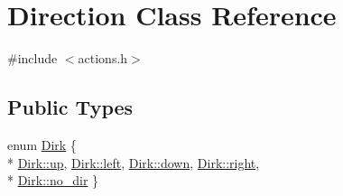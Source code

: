 \hypertarget{class_direction}{\section{Direction Class Reference}
\label{class_direction}
}


{\ttfamily \#include $<$actions.\-h$>$}

\subsection*{Public Types}
\begin{DoxyCompactItemize}
\item 
enum \hyperlink{class_direction_a218282b2789da5abcafb2be32cf99011}{Dirk} \{ \\*
\hyperlink{class_direction_a218282b2789da5abcafb2be32cf99011a46c48bec0d282018b9d167eef7711b2c}{Dirk\-::up}, 
\hyperlink{class_direction_a218282b2789da5abcafb2be32cf99011a811882fecd5c7618d7099ebbd39ea254}{Dirk\-::left}, 
\hyperlink{class_direction_a218282b2789da5abcafb2be32cf99011a74e8333ad11685ff3bdae589c8f6e34d}{Dirk\-::down}, 
\hyperlink{class_direction_a218282b2789da5abcafb2be32cf99011a7c4f29407893c334a6cb7a87bf045c0d}{Dirk\-::right}, 
\\*
\hyperlink{class_direction_a218282b2789da5abcafb2be32cf99011a7a7229b2be097dd8271879ea690eb5bf}{Dirk\-::no\-\_\-dir}
 \}
\end{DoxyCompactItemize}
